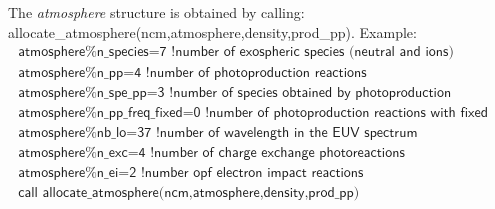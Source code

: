 \documentclass{article}
\begin{document}
The {\it atmosphere} structure is obtained by calling:\\ {\sf allocate\_atmosphere(ncm,atmosphere,density,prod\_pp)}. Example:\\
\[
\begin{array}{l}
  \textsf{  atmosphere\%n\_species=7	      !number of exospheric species (neutral and ions)}\\
  \textsf{  atmosphere\%n\_pp=4    	      !number of photoproduction reactions}\\
  \textsf{  atmosphere\%n\_spe\_pp=3  	      !number of species obtained by photoproduction}\\
  \textsf{  atmosphere\%n\_pp\_freq\_fixed=0  !number of photoproduction reactions with fixed rates}\\
  \textsf{  atmosphere\%nb\_lo=37	      !number of wavelength in the EUV spectrum}\\
  \textsf{  atmosphere\%n\_exc=4	      !number of charge exchange photoreactions}\\
  \textsf{  atmosphere\%n\_ei=2	 	      !number opf electron impact reactions}\\
  \textsf{  call allocate\_atmosphere(ncm,atmosphere,density,prod\_pp)}
\end{array}
\]\\
\end{document}
